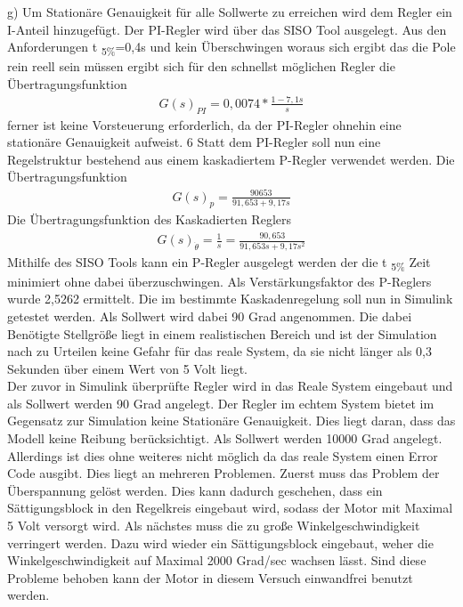 \documentclass[10pt]{scrartcl}
\begin{document}
g)	Um Stationäre Genauigkeit für alle Sollwerte zu erreichen wird dem Regler ein I-Anteil hinzugefügt. Der PI-Regler wird über das SISO Tool ausgelegt. Aus den Anforderungen t \textsubscript{5\%}=0,4s und kein Überschwingen woraus sich ergibt das die Pole rein reell sein müssen ergibt sich für den schnellst möglichen Regler die Übertragungsfunktion
\begin{align}
   G(s)_{PI}=0,0074*\frac{1-7,1s}{s}
\end{align} 
ferner ist keine Vorsteuerung erforderlich, da der PI-Regler ohnehin eine stationäre Genauigkeit aufweist. 
6
	Statt dem PI-Regler soll nun eine Regelstruktur bestehend aus einem kaskadiertem P-Regler verwendet werden. Die Übertragungsfunktion 
\begin{align}
   G(s)_{p}=\frac{90653}{91,653+9,17s}
\end{align} 
	Die Übertragungsfunktion des Kaskadierten Reglers 
\begin{align}
G(s)_{ \dot{\theta}}=\frac{1}{s} = \frac{90,653}{91,653s+9,17s^2}
\end{align}
Mithilfe des SISO Tools kann ein P-Regler ausgelegt werden der die t \textsubscript{5\%} Zeit minimiert ohne dabei überzuschwingen. 
	Als Verstärkungsfaktor des P-Reglers wurde 2,5262 ermittelt.
	Die im bestimmte Kaskadenregelung soll nun in Simulink getestet werden. Als Sollwert wird dabei 90 Grad angenommen. Die dabei Benötigte Stellgröße liegt in einem realistischen Bereich und ist der Simulation nach zu Urteilen keine Gefahr für das reale System, da sie nicht länger als 0,3 Sekunden über einem Wert von 5 Volt liegt.\\
	Der zuvor in Simulink überprüfte Regler wird in das Reale System eingebaut und als Sollwert werden 90 Grad angelegt. Der Regler im echtem System bietet im Gegensatz zur Simulation keine Stationäre Genauigkeit. Dies liegt daran, dass das Modell keine Reibung berücksichtigt.
	Als Sollwert werden 10000 Grad angelegt.
 Allerdings ist dies ohne weiteres nicht möglich da das reale System einen Error Code ausgibt. 
Dies liegt an mehreren Problemen.
	Zuerst muss das Problem der Überspannung gelöst werden. Dies kann dadurch geschehen, dass ein Sättigungsblock in den Regelkreis eingebaut wird, sodass der Motor mit Maximal 5 Volt versorgt wird. Als nächstes muss die zu große Winkelgeschwindigkeit verringert werden. Dazu wird wieder ein Sättigungsblock eingebaut, weher die Winkelgeschwindigkeit auf Maximal 2000 Grad/sec wachsen lässt. Sind diese Probleme behoben kann der Motor in diesem Versuch einwandfrei benutzt werden. 
\newpage
\end{document}
